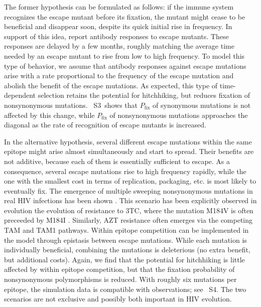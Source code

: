 \documentclass[rmp, twocolumn]{revtex4}
\newcommand{\pfix}{P_{\mathrm{fix}}}
\newcommand{\timedependence}{3}
\newcommand{\withinepi}{4}
\begin{document}
The former hypothesis can be formulated as follows: if the immune system
recognizes the escape mutant before its fixation, the mutant might cease to be
beneficial and disappear soon, despite its quick initial rise in frequency. In
support of this idea, \citet{richman_rapid_2003, bunnik_autologous_2008} report
antibody responses to escape mutants. These responses are delayed by a few
months, roughly matching the average time needed by an escape mutant to rise
from low to high frequency. To model this type of behavior, we assume that
antibody responses against escape mutations arise with a rate proportional to
the frequency of the escape mutation and abolish the benefit of the escape
mutations. As expected, this type of time-dependent selection retains the
potential for hitchhiking, but reduces fixation of nonsynonymous mutations.
\figurename~S\timedependence~shows that $\pfix$ of synonymous mutations is not
affected by this change, while $\pfix$ of nonsynonymous mutations approaches
the diagonal as the rate of recognition of escape mutants is increased. 

In the alternative hypothesis, several different escape mutations within the
same epitope might arise almost simultaneously and start to spread. Their
benefits are not additive, because each of them is essentially sufficient to
escape. As a consequence, several escape mutations rise to high frequency
rapidly, while the one with the smallest cost in terms of replication,
packaging, etc. is most likely to eventually fix. The emergence of multiple
sweeping nonsynonymous mutations in real HIV infections has been shown
\citep{moore_limited_2009, bar_early_2012}. This scenario has been explicitly 
observed in evolution the evolution of resistance to 3TC, where the mutation 
M184V is often preceeded by M184I \citep{hedskog_dynamics_2010}. Similarly, AZT 
resistance often emerges via the competing TAM and TAM1 pathways.
Within epitope competition can be
implemented in the model through epistasis between escape mutations. While each
mutation is individually beneficial, combining the mutations is deleterious (no
extra benefit, but additional costs). Again, we find that the potential for
hitchhiking is little affected by within epitope competition, but that the
fixation probability of nonsynonymous polymorphisms is reduced. With roughly six
mutations per epitope, the simulation data is compatible with observations; see
\figurename~S\withinepi. The two scenarios are not exclusive and possibly both
important in HIV evolution.

\end{document}
